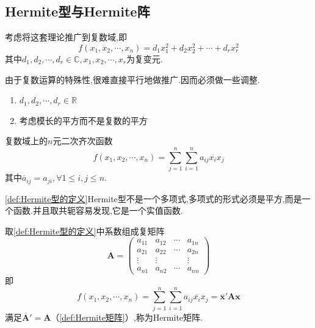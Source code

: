 \subsection{Hermite型与Hermite阵}
考虑将这套理论推广到复数域,即
\[
f\left(
    x_1,x_2,\cdots,x_n
\right)=d_1x_1^2+d_2x_2^2+\cdots+d_rx_r^2
\]其中$d_1,d_2,\cdots,d_r\in\mathbb{C},x_1,x_2,\cdots,x_r$为复变元.
\begin{red}
    \begin{remark}
        由于复数运算的特殊性,很难直接平行地做推广.因而必须做一些调整.
        \begin{enumerate}[label={\textup{(\arabic*)}}]
            \item $d_1,d_2,\cdots,d_r\in\mathbb{R}$
            \item 考虑模长的平方而不是复数的平方
        \end{enumerate}
    \end{remark}
\end{red}
\begin{formal}
    \begin{definition}[Hermite型的定义]\label{def:Hermite型的定义}
        复数域上的$n$元二次齐次函数\[
        f\left(
            x_1,x_2,\cdots,x_n
        \right)=\sum_{j=1}^{n}\sum_{i=1}^{n}a_{ij}\overline{x_i}x_j
        \]其中$\overline{a}_{ij}=a_{ji},\forall 1\leqslant i,j\leqslant n.$
    \end{definition}
\end{formal}
\begin{red}
    \begin{remark}
        \cref{def:Hermite型的定义}\textup{Hermite}型不是一个多项式,多项式的形式必须是平方,而是一个函数.并且取共轭容易发现,它是一个实值函数.
    \end{remark}
\end{red}
\begin{formal}
    \begin{definition}[Hermite矩阵的定义]\label{def:Hermite矩阵的定义}
        取\cref{def:Hermite型的定义}中系数组成复矩阵\[
        \bm{A}=\begin{pmatrix}
               a_{11}&a_{12}&\cdots&a_{1n}\\
                a_{21}&a_{22}&\cdots&a_{2n}\\
                \vdots&\vdots&&\vdots\\
                a_{n1}&a_{n2}&\cdots&a_{nn}  
        \end{pmatrix}
        \]即\[
        f\left(
            x_1,x_2,\cdots,x_n
        \right)=\sum_{j=1}^{n}\sum_{i=1}^{n}a_{ij}\overline{x_i}x_j=\overline{\bm{x}}'\bm{A}\bm{x}
        \]满足$\overline{\bm{A}}'=\bm{A}$（\cref{def:Hermite矩阵}）,称为\textup{Hermite}矩阵.
    \end{definition}
\end{formal}
